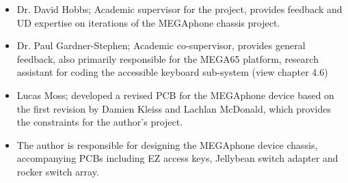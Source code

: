 \begin{itemize} 
    \item Dr. David Hobbs; Academic supervisor for the project, provides feedback and UD expertise on iterations of the MEGAphone chassis project.
    \item Dr. Paul Gardner-Stephen; Academic co-supervisor, provides general feedback, also primarily responsible for the MEGA65 platform, research assistant for coding the accessible keyboard sub-system (view chapter 4.6)
    \item Lucas Moss; developed a revised PCB for the MEGAphone device based on the first revision by Damien Kleiss and Lachlan McDonald, which provides the constraints for the author's project.
    \item The author is responsible for designing the MEGAphone device chassis, accompanying PCBs including EZ access keys, Jellybean switch adapter and rocker switch array.
    \end{itemize}

